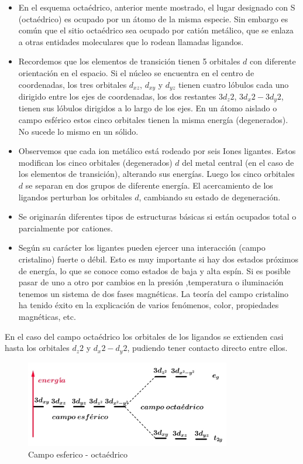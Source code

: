 \begin{itemize}
	\item En el esquema octaédrico, anterior mente mostrado, el lugar designado con S (octaédrico) es ocupado por un átomo de la misma especie. Sin embargo es común que el sitio octaédrico sea ocupado por catión metálico, que se enlaza a otras entidades moleculares que lo rodean llamadas ligandos.
	
	\item Recordemos que los elementos de transición tienen 5 orbitales $d$ con diferente orientación en el espacio. Si el núcleo se encuentra en el centro de coordenadas, los tres orbitales $d_{xz}$, $d_{xy}$ y $d_{yz}$ tienen cuatro lóbulos cada uno dirigido entre los ejes de coordenadas, los dos restantes $3d_{z}2$, $3d_{x}2-3d_{y}2$, tienen sus lóbulos dirigidos a lo largo de los ejes. En un átomo aislado o campo esférico estos cinco orbitales tienen la misma energía (degenerados). No sucede lo mismo en un sólido.

	\item Observemos que cada ion metálico está rodeado por seis Iones ligantes. Estos modifican los cinco orbitales (degenerados) $d$ del metal central (en el caso de los elementos de transición), alterando sus energías. Luego los cinco orbitales $d$ se separan en dos grupos de diferente energía. El acercamiento de los ligandos perturban los orbitales $d$, cambiando su estado de degeneración.

	\item Se originarán diferentes tipos de estructuras básicas si están ocupados total o parcialmente por cationes.
	
	\item Según su carácter los ligantes pueden ejercer una interacción (campo cristalino) fuerte o débil. Esto es muy importante si hay dos estados próximos de energía, lo que se conoce como estados de baja y alta espín. Si es posible pasar de uno a otro por cambios en la presión ,temperatura o iluminación tenemos un sistema de dos fases magnéticas. La teoría del campo cristalino ha tenido éxito en la explicación de varios fenómenos, color, propiedades magnéticas, etc. 

\end{itemize}

En el caso del campo octaédrico los orbitales de los ligandos se extienden casi hasta los orbitales $d_{z}2$ y $d_{x}2-d_{y}2$, pudiendo tener contacto directo entre ellos.


\begin{figure}[H]
    \centering
    \includegraphics[width=0.8\textwidth]{./Figures/campoEsferico1}
	\caption{Campo esferico - octaédrico}
	\label{fig:campoEsferico1}
\end{figure}


